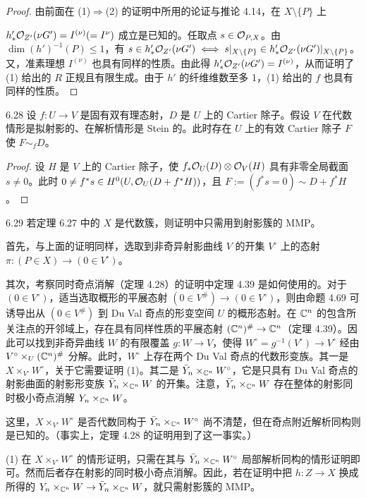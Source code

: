 \begin{proof}
由前面在 (1)$\Rightarrow$(2) 的证明中所用的论证与推论 4.14，在 $X\setminus\{P\}$ 上

$h'_*\mathcal{O}_{Z'}(\nu G')=I^{(\nu)}(=I^{\nu})$ 成立是已知的。任取点 $s\in\mathcal{O}_{P,X}$。由 $\dim(h')^{-1}(P)\le1$，有 $s\in h'_*\mathcal{O}_{Z'}(\nu G')\iff s|_{X\setminus\{P\}}\in h'_*\mathcal{O}_{Z'}(\nu G')|_{X\setminus\{P\}}$。又，准素理想 $I^{(\nu)}$ 也具有同样的性质。由此得 $h'_*\mathcal{O}_{Z'}(\nu G')=I^{(\nu)}$，从而证明了 (1) 给出的 $R$ 正规且有限生成。由于 $h'$ 的纤维维数至多 1，(1) 给出的 $f$ 也具有同样的性质。
\end{proof}

\begin{lemmap}{6.28}
设 $f:U\to V$ 是固有双有理态射，$D$ 是 $U$ 上的 Cartier 除子。假设 $V$ 在代数情形是拟射影的、在解析情形是 Stein 的。此时存在 $U$ 上的有效 Cartier 除子 $F$ 使 $F\sim_f D$。
\end{lemmap}

\begin{proof}
设 $H$ 是 $V$ 上的 Cartier 除子，使 $f_*\mathcal{O}_U(D)\otimes\mathcal{O}_V(H)$ 具有非零全局截面 $s\ne0$。此时 $0\ne f^*s\in H^0(U,\mathcal{O}_U(D+f^*H))$，且 $F:=(f^*s=0)\sim D+f^*H$。
\end{proof}

\begin{remark}{6.29}
若定理 6.27 中的 $X$ 是代数簇，则证明中只需用到射影簇的 MMP。

首先，与上面的证明同样，选取到非奇异射影曲线 $V$ 的开集 $V^\circ$ 上的态射 $\pi:(P\in X)\to(0\in V^\circ)$。

其次，考察同时奇点消解（定理 4.28）的证明中定理 4.39 是如何使用的。对于 $(0\in V^\circ)$，适当选取概形的平展态射 $(0\in V^\#)\to(0\in V^\circ)$，则由命题 4.69 可诱导出从 $(0\in V^\#)$ 到 Du Val 奇点的形变空间 $U$ 的概形态射。在 $\mathbb{C}^n$ 的包含所关注点的开邻域上，存在具有同样性质的平展态射 $(\mathbb{C}^n)^\#\to\mathbb{C}^n$（定理 4.39）。因此可以找到非奇异曲线 $W$ 的有限覆盖 $g:W\to V$，使得 $W^\circ=g^{-1}(V^\circ)\to V^\circ$ 经由 $V^\circ\times_U(\mathbb{C}^n)^\#$ 分解。此时，$W^\circ$ 上存在两个 Du Val 奇点的代数形变族。其一是 $X\times_{V^\circ}W^\circ$，关于它需要证明 (1)。其二是 $\bar Y_n\times_{\mathbb{C}^n}W^\circ$，它是只具有 Du Val 奇点的射影曲面的射影形变族 $\bar Y_n\times_{\mathbb{C}^n}W$ 的开集。注意，$\bar Y_n\times_{\mathbb{C}^n}W$ 存在整体的射影同时极小奇点消解 $Y_n\times_{\mathbb{C}^n}W$。

这里，$X\times_{V^\circ}W^\circ$ 是否代数同构于 $\bar Y_n\times_{\mathbb{C}^n}W^\circ$ 尚不清楚，但在奇点附近解析同构则是已知的。（事实上，定理 4.28 的证明用到了这一事实。）

(1) 在 $X\times_{V^\circ}W^\circ$ 的情形证明，只需在其与 $\bar Y_n\times_{\mathbb{C}^n}W^\circ$ 局部解析同构的情形证明即可。然而后者存在射影的同时极小奇点消解。因此，若在证明中把 $h:Z\to X$ 换成所得的 $Y_n\times_{\mathbb{C}^n}W\to\bar Y_n\times_{\mathbb{C}^n}W$，就只需射影簇的 MMP。
\end{remark}

